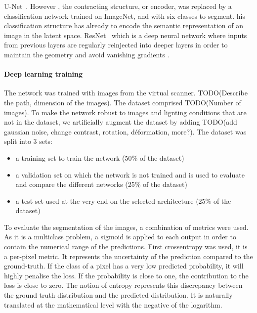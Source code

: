 U-Net~\cite{ronneberger_u-net:_2015}. However , the contracting
structure, or encoder, was replaced by a classification network trained
on ImageNet, and with six classes to segment. his classification
structure has already  to encode the semantic
representation of an image in the latent space. 
ResNet~\cite{he_deep_2015} which is a deep neural network where inputs
from previous layers are regularly reinjected into deeper layers
in order to maintain the geometry and avoid vanishing gradients
\cite{hochreiter_vanishing_1998}.

\paragraph{Deep learning training} The network was trained with
images from the virtual scanner. TODO(Describe the path, dimension
of the images). The dataset comprised TODO(Number of images). To make
the network robust to images and lignting conditions that are not in
the dataset, we artificially augment the dataset by adding TODO(add
gaussian noise, change contrast, rotation, déformation, more?).
The dataset was split into 3 sets:

\begin{itemize}
    \item a training set to train the network (50\% of the dataset)
    \item a validation set on which the network is not trained and
    is used to evaluate and compare the different networks (25\%
    of the dataset) \item a test set used at the very end on the
    selected architecture (25\% of the dataset)
\end{itemize}


To evaluate the segmentation of the images, a combination of
metrics were used. As it is a multiclass problem, a sigmoid is
applied to each output in order to contain the numerical range of
the predictions. First crossentropy was used, it is a per-pixel
metric. It represents the uncertainty of the prediction compared to
the ground-truth. If the class of a pixel has a very low predicted
probability, it will highly penalise the loss. If the probability
is close to one, the contribution to the loss is close to zero. The
notion of entropy represents this discrepancy between the ground truth
distribution and the predicted distribution. It is naturally translated
at the mathematical level with the negative of the logarithm.

